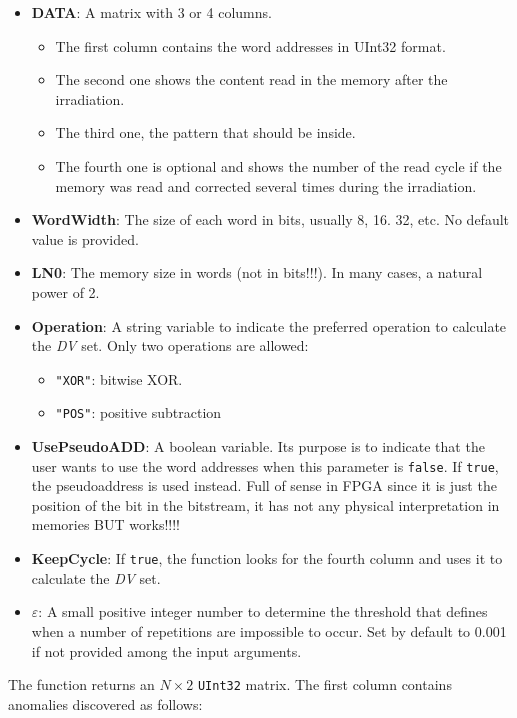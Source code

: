 \begin{itemize}
\begin{itemize}
	 	\item   \textbf{DATA}: A matrix with 3 or 4 columns. 
	 	\begin{itemize}
	 		\item The first column contains the word addresses in UInt32 format.
	 		\item The second one shows the content read in the memory after the irradiation.
	 		\item The third one, the pattern that should be inside.
	 		\item  The fourth one is optional and shows the number of the read cycle if the   memory was read and corrected several times during the irradiation.
	 	\end{itemize}
	 	\item   \textbf{WordWidth}: The size of each word in bits, usually 8, 16. 32, etc. No default value is provided.
	 	\item   \textbf{LN0}: The memory size in words (not in bits!!!). In many cases, a natural power of 2.
	 	\item   \textbf{Operation}: A string variable to indicate the preferred operation to calculate
	 	the \textit{DV} set. Only two operations are allowed: 
	 	\begin{itemize}
	 		\item \texttt{"XOR"}: bitwise XOR.
	 		\item\texttt{"POS"}: positive subtraction
	 	\end{itemize}
	 	\item  \textbf{UsePseudoADD}: A boolean variable. Its purpose is to indicate that the user wants to use the word addresses when this parameter is \texttt{false}. If \texttt{true}, the pseudoaddress  is used instead. Full of sense in FPGA since it is just the position  of the bit in the bitstream, it has not any physical interpretation in memories BUT works!!!!
	 	\item   \textbf{KeepCycle}: If \texttt{true}, the function looks for the fourth column and uses it to calculate the \textit{DV} set.
	 	\item   \textbf{\(\varepsilon\)}: A small positive integer number to determine the threshold that defines when a number of repetitions are impossible to occur. Set by default to 0.001 if not provided among the input arguments.
	 \end{itemize}
	 
	 The function returns an \(N\times 2\) \texttt{UInt32} matrix. The first column contains anomalies discovered as follows:
	 

\end{itemize}
